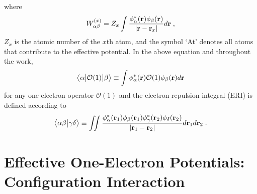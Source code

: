 %
where 
%
\begin{equation}
 W_{\alpha\beta}^{(x)} = 
 Z_x \int \frac{\phi^*_\alpha({\bf r}) \phi_\beta({\bf r})}{\vert {\bf r} - {\bf r}_x \vert} d{\bf r} \;,
\end{equation}
%
$Z_x$ is the atomic number of the $x$th atom,
and the symbol `At' denotes all atoms that contribute to the effective potential.
In the above equation and throughout the work, 
%
\begin{equation}
\bigl\langle {\alpha} \bigl\lvert {\mathcal{O}(1)} \bigl\lvert {\beta} \bigr\rangle \equiv \int \phi^*_\alpha({\bf r}) \mathcal{O}(1) \phi_\beta({\bf r}) d{\bf r} 
\end{equation}
%
for any one\hyp{}electron operator $\mathcal{O}(1)$ 
and the electron repulsion integral (ERI)
is defined according to
%
\begin{equation}
	\bigl\langle {\alpha\beta} \bigl\lvert {\gamma\delta} \bigr\rangle \equiv
	\iint 
	\frac{ \phi_\alpha^{*}({\bf r}_1) \phi_\beta({\bf r}_1) 
	       \phi_\gamma^{*}({\bf r}_2) \phi_\delta({\bf r}_2) }{ \vert {\bf r}_1 - {\bf r}_2 \vert}
	d{\bf r}_1 d{\bf r}_2  \;.
\end{equation}
%


\section{\label{s:3}Effective One-Electron Potentials: Configuration Interaction}

